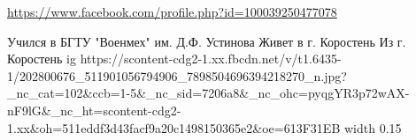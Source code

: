  
 
 
 
 

\url{https://www.facebook.com/profile.php?id=100039250477078}\par
Учился в БГТУ "Военмех" им. Д.Ф. Устинова
Живет в г. Коростень
Из г. Коростень
\ifcmt
  ig https://scontent-cdg2-1.xx.fbcdn.net/v/t1.6435-1/202800676_511901056794906_7898504696394218270_n.jpg?_nc_cat=102&ccb=1-5&_nc_sid=7206a8&_nc_ohc=pyqgYR3p72wAX-nF9lG&_nc_ht=scontent-cdg2-1.xx&oh=511eddf3d43facf9a20c1498150365e2&oe=613F31EB
  width 0.15
\fi

